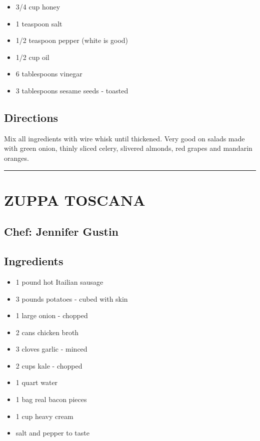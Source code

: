 \documentclass[
]{book}
\providecommand{\tightlist}{%
  \setlength{\itemsep}{0pt}\setlength{\parskip}{0pt}}
\begin{document}
\begin{itemize}
\tightlist
\item
  3/4 cup honey
\item
  1 teaspoon salt
\item
  1/2 teaspoon pepper (white is good)
\item
  1/2 cup oil
\item
  6 tablespoons vinegar
\item
  3 tablespoons sesame seeds - toasted
\end{itemize}

\hypertarget{directions-23}{%
\subsection*{Directions}\label{directions-23}}


Mix all ingredients with wire whisk until thickened. Very good on salads made with green onion, thinly sliced celery, slivered almonds, red grapes and mandarin oranges.

\begin{center}\rule{0.5\linewidth}{0.5pt}\end{center}

\hypertarget{zuppa-toscana}{%
\section*{ZUPPA TOSCANA}\label{zuppa-toscana}}


\hypertarget{chef-jennifer-gustin-6}{%
\subsection*{Chef: Jennifer Gustin}\label{chef-jennifer-gustin-6}}


\hypertarget{ingredients-24}{%
\subsection*{Ingredients}\label{ingredients-24}}


\begin{itemize}
\tightlist
\item
  1 pound hot Itailian sausage
\item
  3 pounds potatoes - cubed with skin
\item
  1 large onion - chopped
\item
  2 cans chicken broth
\item
  3 cloves garlic - minced
\item
  2 cups kale - chopped
\item
  1 quart water
\item
  1 bag real bacon pieces
\item
  1 cup heavy cream
\item
  salt and pepper to taste
\end{itemize}
\end{document}
